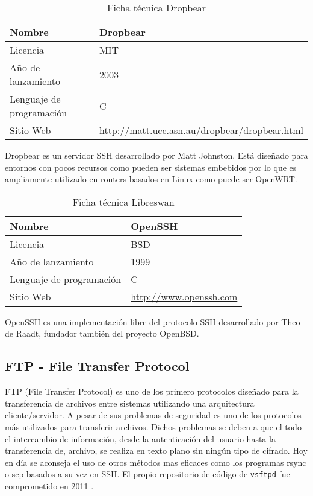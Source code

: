 \begin{table}[H]
\begin{tabular}{|l|l|}
\hline
Nombre                   & Dropbear                       \\ \hline
Licencia                 & MIT                            \\ \hline
Año de lanzamiento       & 2003                           \\ \hline
Lenguaje de programación & C                              \\ \hline
Sitio Web                & \url{http://matt.ucc.asn.au/dropbear/dropbear.html} \\ \hline
\end{tabular}
\caption{Ficha técnica Dropbear}
\end{table}

Dropbear es un servidor SSH desarrollado por Matt Johnston. Está diseñado para entornos con pocos recursos como pueden ser sistemas embebidos por lo que es ampliamente utilizado en routers basados en Linux como puede ser OpenWRT.

\begin{table}[H]
\begin{tabular}{|l|l|}
\hline
Nombre                   & OpenSSH                       \\ \hline
Licencia                 & BSD                            \\ \hline
Año de lanzamiento       & 1999                           \\ \hline
Lenguaje de programación & C                              \\ \hline
Sitio Web                & \url{http://www.openssh.com} \\ \hline
\end{tabular}
\caption{Ficha técnica Libreswan}
\end{table}

OpenSSH es una implementación libre del protocolo SSH desarrollado por Theo de Raadt, fundador también del proyecto OpenBSD.

\subsection {FTP - File Transfer Protocol}

FTP (File Transfer Protocol) es uno de los primero protocolos diseñado para la transferencia de archivos entre sistemas utilizando una arquitectura cliente/servidor. A pesar de sus problemas de seguridad \cite{todd_why_2000} es uno de los protocolos más utilizados para transferir archivos. Dichos problemas se deben a que el todo el intercambio de información, desde la autenticación del usuario hasta la transferencia de, archivo, se realiza en texto plano sin ningún tipo de cifrado. Hoy en día se aconseja el uso de otros métodos mas eficaces como los programas rsync o scp basados a su vez en SSH. El propio repositorio de código de \texttt{vsftpd} fue comprometido en 2011 \cite{hkcert_security_bulletin_sa11070501_2011}.

